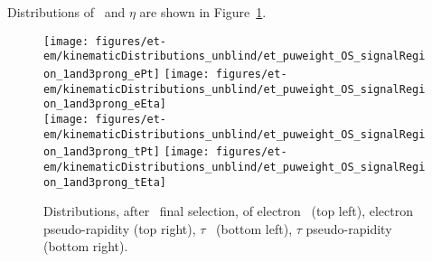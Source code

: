 Distributions of \pt ~and $\eta$ are shown in Figure~\ref{fig:etau_sr_pt_eta}.
\begin{figure}[thbp!]\centering
  \texttt{[image: figures/et-em/kinematicDistributions\_unblind/et\_puweight\_OS\_signalRegion\_1and3prong\_ePt]}
  \texttt{[image: figures/et-em/kinematicDistributions\_unblind/et\_puweight\_OS\_signalRegion\_1and3prong\_eEta]} \\
  \texttt{[image: figures/et-em/kinematicDistributions\_unblind/et\_puweight\_OS\_signalRegion\_1and3prong\_tPt]}
  \texttt{[image: figures/et-em/kinematicDistributions\_unblind/et\_puweight\_OS\_signalRegion\_1and3prong\_tEta]}
  \caption{\label{fig:etau_sr_pt_eta} Distributions, after \teth ~final
    selection, of electron \pt ~(top left), electron pseudo-rapidity
    (top right), $\tau$ \pt ~(bottom left), $\tau$ pseudo-rapidity
    (bottom right).}
\end{figure}




